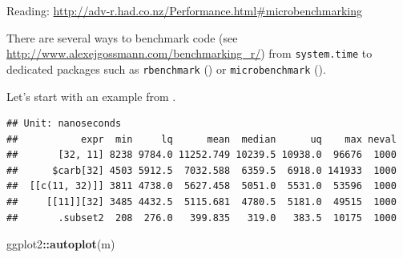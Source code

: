 \documentclass[]{book}
\newenvironment{Shaded}{\begin{snugshade}}{\end{snugshade}}
\newcommand{\KeywordTok}[1]{\textcolor[rgb]{0.13,0.29,0.53}{\textbf{#1}}}
\newcommand{\DataTypeTok}[1]{\textcolor[rgb]{0.13,0.29,0.53}{#1}}
\newcommand{\DecValTok}[1]{\textcolor[rgb]{0.00,0.00,0.81}{#1}}
\newcommand{\StringTok}[1]{\textcolor[rgb]{0.31,0.60,0.02}{#1}}
\newcommand{\CommentTok}[1]{\textcolor[rgb]{0.56,0.35,0.01}{\textit{#1}}}
\newcommand{\OperatorTok}[1]{\textcolor[rgb]{0.81,0.36,0.00}{\textbf{#1}}}
\newcommand{\NormalTok}[1]{#1}
\theoremstyle{definition}
\theoremstyle{definition}
\theoremstyle{definition}
\theoremstyle{remark}
\begin{document}
Reading:
\url{http://adv-r.had.co.nz/Performance.html\#microbenchmarking}

There are several ways to benchmark code (see
\url{http://www.alexejgossmann.com/benchmarking_r/}) from
\texttt{system.time} to dedicated packages such as \texttt{rbenchmark}
(\citet{rbenchmark}) or \texttt{microbenchmark}
(\citet{microbenchmark}).

Let's start with an example from \citet{Wickham2014}.

\begin{Shaded}
\end{Shaded}

\begin{verbatim}
## Unit: nanoseconds
##           expr  min     lq      mean  median      uq    max neval
##       [32, 11] 8238 9784.0 11252.749 10239.5 10938.0  96676  1000
##      $carb[32] 4503 5912.5  7032.588  6359.5  6918.0 141933  1000
##  [[c(11, 32)]] 3811 4738.0  5627.458  5051.0  5531.0  53596  1000
##     [[11]][32] 3485 4432.5  5115.681  4780.5  5181.0  49515  1000
##       .subset2  208  276.0   399.835   319.0   383.5  10175  1000
\end{verbatim}

\begin{Shaded}
\begin{Highlighting}[]
\NormalTok{ggplot2}\OperatorTok{::}\KeywordTok{autoplot}\NormalTok{(m)}
\end{Highlighting}
\end{Shaded}
\end{document}
